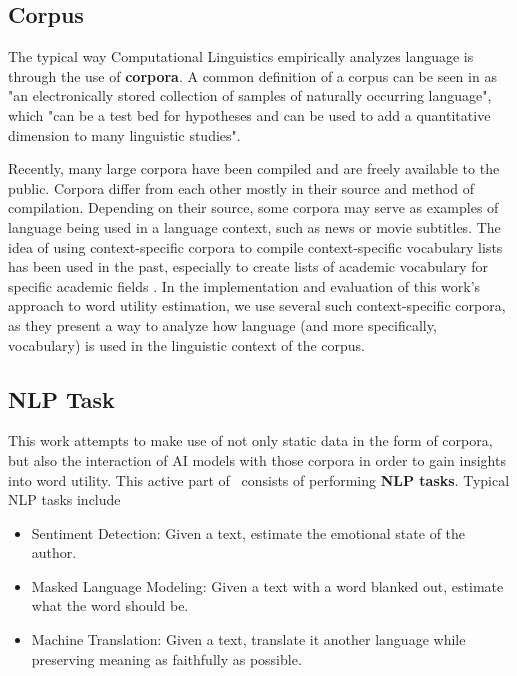 \subsection{Corpus}
The typical way Computational Linguistics empirically analyzes language is through the use of \textbf{corpora}.
A common definition of a corpus can be seen in \cite{hunstonCorpusLinguistics2006a} as "an electronically stored collection of samples of naturally occurring language", which "can be a test bed for hypotheses and can be used to add a quantitative dimension to many linguistic studies".

Recently, many large corpora have been compiled and are freely available to the public.
Corpora differ from each other mostly in their source and method of compilation.
Depending on their source, some corpora may serve as examples of language being used in a language context, such as news or movie subtitles.
The idea of using context-specific corpora to compile context-specific vocabulary lists has been used in the past, especially to create lists of academic vocabulary for specific academic fields \cite{xodabandeDevelopingValidatingMidfrequency2023} \cite{gholaminejadAcademicVocabularyCollocations2020}.
In the implementation and evaluation of this work's approach to word utility estimation, we use several such context-specific corpora, as they present a way to analyze how language (and more specifically, vocabulary) is used in the linguistic context of the corpus.

\subsection{NLP Task}
This work attempts to make use of not only static data in the form of corpora, but also the interaction of AI models with those corpora in order to gain insights into word utility.
This active part of \NLP\ consists of performing \textbf{NLP tasks}.
Typical NLP tasks include \cite{jurafskySpeechLanguageProcessing2025}

\begin{itemize}
	\item Sentiment Detection: Given a text, estimate the emotional state of the author.
	\item Masked Language Modeling: Given a text with a word blanked out, estimate what the word should be.
	\item Machine Translation: Given a text, translate it another language while preserving meaning as faithfully as possible.
\end{itemize}

